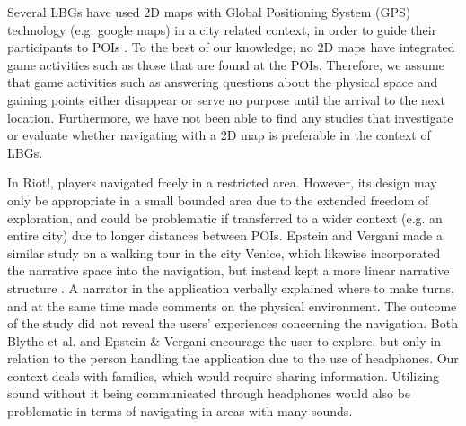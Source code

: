 Several LBGs have used 2D maps with Global Positioning System (GPS) technology (e.g. google maps) in a city related context, in order to guide their participants to POIs \cite{TheoreticalAndMethod, Learninggamified, knowcity, Carrigy:2010:DEP:1868914.1868929, GamingTourism, Procyk:2013:GLG:2468356.2468550, Bell:2009:ESN:1518701.1518723}. To the best of our knowledge, no 2D maps have integrated game activities such as those that are found at the POIs. Therefore, we assume that game activities such as answering questions about the physical space and gaining points either disappear or serve no purpose until the arrival to the next location. Furthermore, we have not been able to find any studies that investigate or evaluate whether navigating with a 2D map is preferable in the context of LBGs.

In Riot!\cite{InterdisciplinaryCriticism}, players navigated freely in a restricted area. However, its design may only be appropriate in a small bounded area due to the extended freedom of exploration, and could be problematic if transferred to a wider context (e.g. an entire city) due to longer distances between POIs. Epstein and Vergani made a similar study on a walking tour in the city Venice, which likewise incorporated the narrative space into the navigation, but instead kept a more linear narrative structure \cite{MobileTechnologies}. A narrator in the application verbally explained where to make turns, and at the same time made comments on the physical environment. The outcome of the study did not reveal the users' experiences concerning the navigation. Both Blythe et al. and Epstein \& Vergani encourage the user to explore, but only in relation to the person handling the application due to the use of headphones. Our context deals with families, which would require sharing information. Utilizing sound without it being communicated through headphones would also be problematic in terms of navigating in areas with many sounds. 


